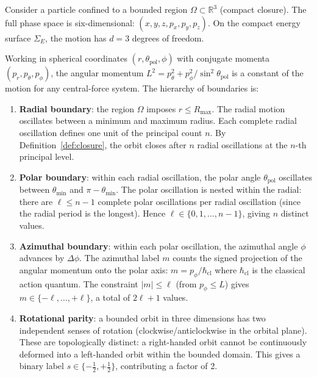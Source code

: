 \documentclass[twocolumn,10pt,a4paper]{article}
\theoremstyle{thmstyle}
\theoremstyle{definition}
\theoremstyle{remark}
\newcommand{\R}{\mathbb{R}}
\begin{document}
Consider a particle confined to a bounded region $\Omega \subset \R^3$ (compact closure). The full phase space is six-dimensional: $(x, y, z, p_x, p_y, p_z)$. On the compact energy surface $\Sigma_E$, the motion has $d = 3$ degrees of freedom.

Working in spherical coordinates $(r, \theta_\text{pol}, \phi)$ with conjugate momenta $(p_r, p_\theta, p_\phi)$, the angular momentum $L^2 = p_\theta^2 + p_\phi^2 / \sin^2\theta_\text{pol}$ is a constant of the motion for any central-force system. The hierarchy of boundaries is:

\begin{enumerate}[leftmargin=1.5em,itemsep=0.2em]
\item \textbf{Radial boundary}: the region $\Omega$ imposes $r \leq R_{\max}$. The radial motion oscillates between a minimum and maximum radius. Each complete radial oscillation defines one unit of the principal count $n$. By Definition~\ref{def:closure}, the orbit closes after $n$ radial oscillations at the $n$-th principal level.

\item \textbf{Polar boundary}: within each radial oscillation, the polar angle $\theta_\text{pol}$ oscillates between $\theta_{\min}$ and $\pi - \theta_{\min}$. The polar oscillation is nested within the radial: there are $\ell \leq n-1$ complete polar oscillations per radial oscillation (since the radial period is the longest). Hence $\ell \in \{0, 1, \ldots, n-1\}$, giving $n$ distinct values.

\item \textbf{Azimuthal boundary}: within each polar oscillation, the azimuthal angle $\phi$ advances by $\Delta\phi$. The azimuthal label $m$ counts the signed projection of the angular momentum onto the polar axis: $m = p_\phi / \hbar_{\mathrm{cl}}$ where $\hbar_{\mathrm{cl}}$ is the classical action quantum. The constraint $|m| \leq \ell$ (from $p_\phi \leq L$) gives $m \in \{-\ell, \ldots, +\ell\}$, a total of $2\ell + 1$ values.

\item \textbf{Rotational parity}: a bounded orbit in three dimensions has two independent senses of rotation (clockwise/anticlockwise in the orbital plane). These are topologically distinct: a right-handed orbit cannot be continuously deformed into a left-handed orbit within the bounded domain. This gives a binary label $s \in \{-\tfrac{1}{2}, +\tfrac{1}{2}\}$, contributing a factor of 2.
\end{enumerate}
\end{document}

